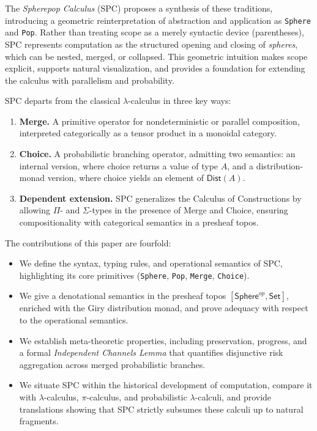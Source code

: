 \documentclass{article}
\begin{document}
The \emph{Spherepop Calculus} (SPC) proposes a synthesis of these traditions,
introducing a geometric reinterpretation of abstraction and application as
\texttt{Sphere} and \texttt{Pop}. Rather than treating scope as a merely
syntactic device (parentheses), SPC represents computation as the structured
opening and closing of \emph{spheres}, which can be nested, merged, or
collapsed. This geometric intuition makes scope explicit, supports natural
visualization, and provides a foundation for extending the calculus with
parallelism and probability.

SPC departs from the classical $\lambda$-calculus in three key ways:
\begin{enumerate}
  \item \textbf{Merge.} A primitive operator for nondeterministic or parallel
  composition, interpreted categorically as a tensor product in a monoidal
  category.
  \item \textbf{Choice.} A probabilistic branching operator, admitting two
  semantics: an internal version, where choice returns a value of type $A$, and a
  distribution-monad version, where choice yields an element of
  $\mathsf{Dist}(A)$.
  \item \textbf{Dependent extension.} SPC generalizes the Calculus of
  Constructions by allowing $\Pi$- and $\Sigma$-types in the presence of Merge
  and Choice, ensuring compositionality with categorical semantics in a presheaf
  topos.
\end{enumerate}

The contributions of this paper are fourfold:
\begin{itemize}
  \item We define the syntax, typing rules, and operational semantics of SPC,
  highlighting its core primitives (\texttt{Sphere}, \texttt{Pop},
  \texttt{Merge}, \texttt{Choice}).
  \item We give a denotational semantics in the presheaf topos
  $[\mathsf{Sphere}^{op},\mathsf{Set}]$, enriched with the Giry distribution
  monad, and prove adequacy with respect to the operational semantics.
  \item We establish meta-theoretic properties, including preservation,
  progress, and a formal \emph{Independent Channels Lemma} that quantifies
  disjunctive risk aggregation across merged probabilistic branches.
  \item We situate SPC within the historical development of computation, compare
  it with $\lambda$-calculus, $\pi$-calculus, and probabilistic $\lambda$-calculi,
  and provide translations showing that SPC strictly subsumes these calculi up
  to natural fragments.
\end{itemize}
\end{document}
